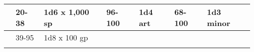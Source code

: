 \begin{longtable}{llllllllllllll}
\hline
\multicolumn{8}{p{1.150in}|}{\begin{minipage}[t]{1.150in}\centering
\end{minipage}} & \multicolumn{1}{|p{0.393in}|}{\begin{minipage}[t]{0.393in}\raggedright
20-38\end{minipage}} & \multicolumn{1}{p{0.469in}|}{\begin{minipage}[t]{0.469in}\raggedright
1d6 x 1,000 sp\end{minipage}} & \multicolumn{1}{p{0.923in}|}{\begin{minipage}[t]{0.923in}\raggedright
96-100\end{minipage}} & \multicolumn{1}{p{0.469in}|}{\begin{minipage}[t]{0.469in}\raggedright
1d4 art\end{minipage}} & \multicolumn{1}{p{0.626in}|}{\begin{minipage}[t]{0.626in}\raggedright
68-100\end{minipage}} & \multicolumn{1}{p{0.469in}|}{\begin{minipage}[t]{0.469in}\centering
1d3 minor\end{minipage}}\\
\hline
\multicolumn{8}{p{1.150in}|}{\begin{minipage}[t]{1.150in}\centering
\end{minipage}} & \multicolumn{1}{|p{0.393in}|}{\begin{minipage}[t]{0.393in}\raggedright
39-95\end{minipage}} & \multicolumn{1}{p{0.469in}|}{\begin{minipage}[t]{0.469in}\raggedright
1d8 x 100 gp\end{minipage}} & \multicolumn{1}{p{0.923in}|}{\begin{minipage}[t]{0.923in}\raggedright
\end{minipage}} & \multicolumn{1}{p{0.469in}|}{\begin{minipage}[t]{0.469in}\raggedright
\end{minipage}} & \multicolumn{1}{p{0.626in}|}{\begin{minipage}[t]{0.626in}\raggedright
\end{minipage}} & \multicolumn{1}{p{0.469in}|}{\begin{minipage}[t]{0.469in}\centering
\end{minipage}}\\
\hline
\multicolumn{8}{p{1.150in}|}{\begin{minipage}[t]{1.150in}\centering

\end{minipage}}
\end{longtable}
